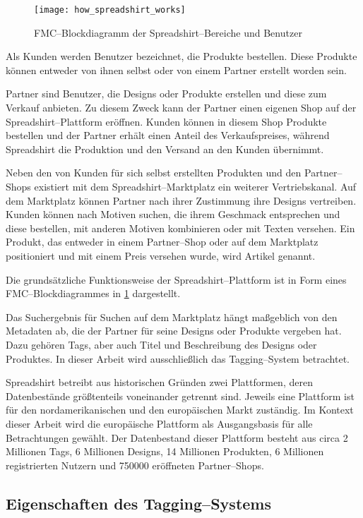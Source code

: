\begin{figure}[ht]
\centering
\texttt{[image: how\_spreadshirt\_works]}
\caption{FMC--Blockdiagramm der Spreadshirt--Bereiche und Benutzer}
\label{fig:howspreadshirtworks}
\end{figure}

Als Kunden werden Benutzer bezeichnet, die Produkte bestellen. Diese Produkte können entweder von ihnen selbst oder von einem Partner erstellt worden sein. 

Partner sind Benutzer, die Designs oder Produkte erstellen und diese zum Verkauf anbieten. Zu diesem Zweck kann der Partner einen eigenen Shop auf der Spreadshirt--Plattform eröffnen. Kunden können in diesem Shop Produkte bestellen und der Partner erhält einen Anteil des Verkaufspreises, während Spreadshirt die Produktion und den Versand an den Kunden übernimmt.

Neben den von Kunden für sich selbst erstellten Produkten und den Partner--Shops existiert mit dem Spreadshirt--Marktplatz ein weiterer Vertriebskanal. Auf dem Marktplatz können Partner nach ihrer Zustimmung ihre Designs vertreiben. Kunden können nach Motiven suchen, die ihrem Geschmack entsprechen und diese bestellen, mit anderen Motiven kombinieren oder mit Texten versehen. Ein Produkt, das entweder in einem Partner--Shop oder auf dem Marktplatz positioniert und mit einem Preis versehen wurde, wird Artikel genannt.

Die grundsätzliche Funktionsweise der Spreadshirt--Plattform ist in Form eines FMC--Blockdiagrammes in \cref{fig:howspreadshirtworks} dargestellt.

Das Suchergebnis für Suchen auf dem Marktplatz hängt maßgeblich von den Metadaten ab, die der Partner für seine Designs oder Produkte vergeben hat. Dazu gehören Tags, aber auch Titel und Beschreibung des Designs oder Produktes. In dieser Arbeit wird ausschließlich das Tagging--System betrachtet.

\label{platforms}
Spreadshirt betreibt aus historischen Gründen zwei Plattformen, deren Datenbestände größtenteils voneinander getrennt sind. Jeweils eine Plattform ist für den nordamerikanischen und den europäischen Markt zuständig. Im Kontext dieser Arbeit wird die europäische Plattform als Ausgangsbasis für alle Betrachtungen gewählt. Der Datenbestand dieser Plattform besteht aus circa 2 Millionen Tags, 6 Millionen Designs, 14 Millionen Produkten, 6 Millionen registrierten Nutzern und \num{750000} eröffneten Partner--Shops.

\subsection{Eigenschaften des Tagging--Systems}
\label{tag_sprd}

